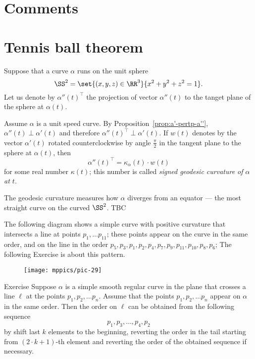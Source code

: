 \section{Comments}


\section{Tennis ball theorem}

Suppose that a curve $\alpha$ runs on the unit sphere 
\[\SS^2=\set{(x,y,z)\in\RR^3}{x^2+y^2+z^2=1}.\] 
Let us denote by $\alpha''(t)^\top$ the projection of vector $\alpha''(t)$ to the tanget plane of the sphere at $\alpha(t)$.

Assume $\alpha$ is a unit speed curve.
By Proposition~\ref{prop:a'-pertp-a''}, $\alpha''(t)\perp\alpha'(t)$ and therefore $\alpha''(t)^\top\perp\alpha'(t)$.
If $w(t)$ denotes by the vector $\alpha'(t)$ rotated
counterclockwise by angle $\tfrac\pi2$ in the tangent plane to the sphere at $\alpha(t)$, then 
\[\alpha''(t)^\top=\kappa_\alpha(t)\cdot w(t)\]
for some real number $\kappa(t)$;
this number is called \emph{signed geodesic curvature of $\alpha$ at $t$}.

The geodesic curvature measures how $\alpha$ diverges from an equator --- the most straight curve on the curved $\SS^2$.
TBC














The following diagram shows a simple curve with positive curvature that intersects a line at points $p_1,\dots p_11$; these points appear on the curve in the same order, and on the line  in the order $p_5,p_3,p_1,p_2,p_4,p_7,p_9,p_{11},p_{10},p_8,p_6$; 
The following Exercise is about this pattern.

\begin{figure}[h!]
\vskip-0mm
\centering
\texttt{[image: mppics/pic-29]}
\vskip0mm
\end{figure}

\begin{thm}{Exercise}
Suppose $\alpha$ is a simple smooth regular curve in the plane that crosses a line $\ell$ at the points $p_1,p_2,\dots p_n$.
Assume that the points $p_1,p_2,\dots p_n$ appear on $\alpha$ in the same order.
Then the order on $\ell$ can be obtained from the following sequence 
\[p_1,p_3,\dots,p_4 ,p_2\]
by shift last $k$ elements to the beginning, reverting the order in the tail starting from $(2\cdot k+1)$-th element and reverting the order of the obtained sequence if necessary.
\end{thm}






